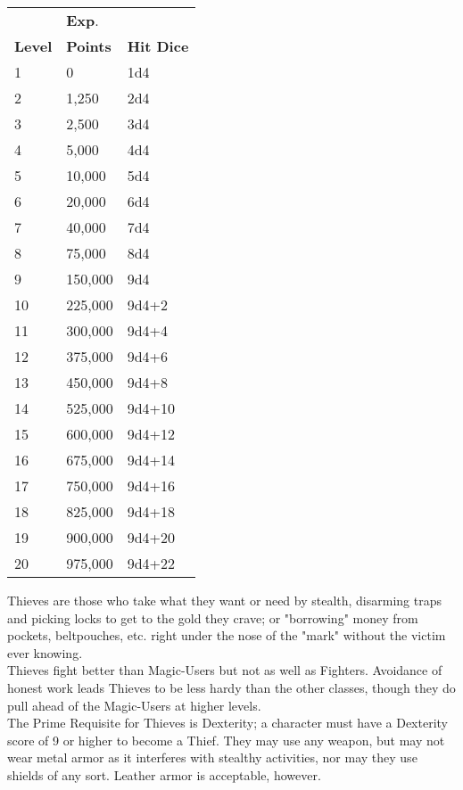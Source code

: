 \documentclass[a4paper,twoside,openany,10pt]{book}
\begin{document}
\begin{multicols}{2}
\begin{tabular*}{0.93\linewidth}{@{\extracolsep{\fill}}lll}
& \textbf{Exp}. & \\
\textbf{Level} & \textbf{Points} & \textbf{Hit Dice} \\\toprule
1 & 0 & 1d4 \\\hline
2 & 1,250 & 2d4 \\\hline
3 & 2,500 & 3d4 \\\hline
4 & 5,000 & 4d4 \\\hline
5 & 10,000 & 5d4 \\\hline
6 & 20,000 & 6d4 \\\hline
7 & 40,000 & 7d4 \\\hline
8 & 75,000 & 8d4 \\\hline
9 & 150,000 & 9d4 \\\hline
10 & 225,000 & 9d4+2 \\\hline
11 & 300,000 & 9d4+4 \\\hline
12 & 375,000 & 9d4+6 \\\hline
13 & 450,000 & 9d4+8 \\\hline
14 & 525,000 & 9d4+10 \\\hline
15 & 600,000 & 9d4+12 \\\hline
16 & 675,000 & 9d4+14 \\\hline
17 & 750,000 & 9d4+16 \\\hline
18 & 825,000 & 9d4+18 \\\hline
19 & 900,000 & 9d4+20 \\\hline
20 & 975,000 & 9d4+22 \\\bottomrule
\end{tabular*}\medskip

Thieves are those who take what they want or need by stealth, disarming traps and picking locks to get to the gold they crave; or "borrowing" money from pockets, beltpouches, etc. right under the nose of the "mark" without the victim ever knowing.\\

Thieves fight better than Magic-Users but not as well as Fighters. Avoidance of honest work leads Thieves to be less hardy than the other classes, though they do pull ahead of the Magic-Users at higher levels.\\

The Prime Requisite for Thieves is Dexterity; a character must have a Dexterity score of 9 or higher to become a Thief. They may use any weapon, but may not wear metal armor as it interferes with stealthy activities, nor may they use shields of any sort. Leather armor is acceptable, however.\\


\end{multicols}
\end{document}
